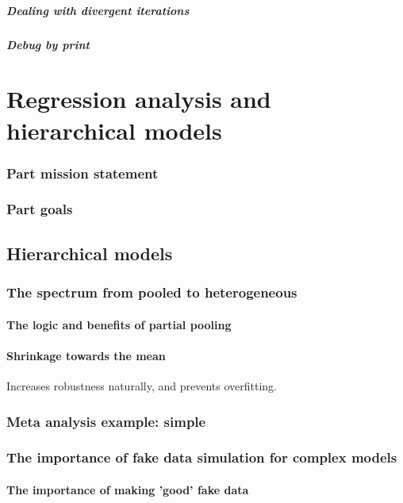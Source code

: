 \documentclass[11pt,fullpage]{book}
\begin{document}
\subsubsection{Dealing with divergent iterations}\label{sec:StanJags_divergentSolution}
\subsubsection{Debug by print}

\part{Regression analysis and hierarchical models}\label{part:regressionHierarchical}
\section{Part mission statement}
\section{Part goals}

\chapter{Hierarchical models}\label{chap:hierarchicalModels}
\section{The spectrum from pooled to heterogeneous}
\subsection{The logic and benefits of partial pooling}
\subsection{Shrinkage towards the mean}
Increases robustness naturally, and prevents overfitting.

\section{Meta analysis example: simple}

\section{The importance of fake data simulation for complex models}
\subsection{The importance of making 'good' fake data}
\end{document}
